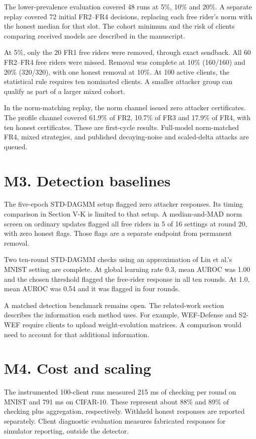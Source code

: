 \documentclass[11pt,a4paper]{article}
\begin{document}
The lower-prevalence evaluation covered 48 runs at 5\%, 10\% and 20\%.
A separate replay covered 72 initial FR2--FR4 decisions, replacing each
free rider's norm with the honest median for that slot. The cohort
minimum and the risk of clients comparing received models are described
in the manuscript.

At 5\%, only the 20 FR1 free riders were removed, through exact sendback.
All 60 FR2--FR4 free riders were missed. Removal was complete at 10\%
(160/160) and 20\% (320/320), with one honest removal at 10\%. At 100
active clients, the statistical rule requires ten nominated clients.
A smaller attacker group can qualify as part of a larger mixed cohort.

In the norm-matching replay, the norm channel issued zero attacker
certificates. The profile channel covered 61.9\% of FR2, 10.7\% of FR3
and 17.9\% of FR4, with ten honest certificates. These are first-cycle
results. Full-model norm-matched FR4, mixed strategies, and published
decaying-noise and scaled-delta attacks are queued.

\section*{M3. Detection baselines}

The five-epoch STD-DAGMM setup flagged zero attacker responses. Its timing
comparison in Section V-K is limited to that setup. A median-and-MAD
norm screen on ordinary updates flagged all free riders in 5 of 16
settings at round 20, with zero honest flags. Those flags are a separate
endpoint from permanent removal.

Two ten-round STD-DAGMM checks using an approximation of Lin et al.'s
MNIST setting are complete. At global learning rate 0.3, mean AUROC was
1.00 and the chosen threshold flagged the free-rider response in all ten
rounds. At 1.0, mean AUROC was 0.54 and it was flagged in four rounds.

A matched detection benchmark remains open. The related-work section
describes the information each method uses. For example, WEF-Defense
and S2-WEF require clients to upload weight-evolution matrices. A
comparison would need to account for that additional information.

\section*{M4. Cost and scaling}

The instrumented 100-client runs measured 215 ms of checking per round
on MNIST and 791 ms on CIFAR-10. These represent about 88\% and 89\% of
checking plus aggregation, respectively. Withheld honest responses are
reported separately. Client diagnostic evaluation measures fabricated
responses for simulator reporting, outside the detector.
\end{document}
